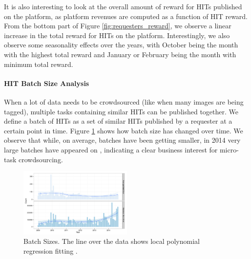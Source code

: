 It is also interesting to look at the overall amount of reward for HITs published on the platform, as platform revenues are computed as a function of HIT reward. From the bottom part of Figure \ref{fig:requesters_reward}, we observe a linear increase in the total reward for HITs on the platform. Interestingly, we also observe some seasonality effects over the years, with October being the month with the highest total reward and January or February being the month with minimum total reward.


\paragraph{HIT Batch Size Analysis}
When a lot of data needs to be crowdsourced (like when many images are being tagged), multiple  tasks containing similar HITs can be published together. We define a batch of HITs as a set of similar HITs published by a requester at a certain point in time. Figure \ref{fig:batch_size} shows how batch size has changed over time.
We observe that while, on average, batches have been getting smaller, in 2014 very large batches have appeared on \amt{}, indicating a clear business interest for micro-task crowdsourcing.

\begin{figure}[tb]
	\centering
		\includegraphics[width=0.5\textwidth]{figures/batch_size}
	\caption{Batch Sizes. The line over the data shows local polynomial regression fitting \cite{cleveland1992local}.}
	\label{fig:batch_size}
\end{figure}


